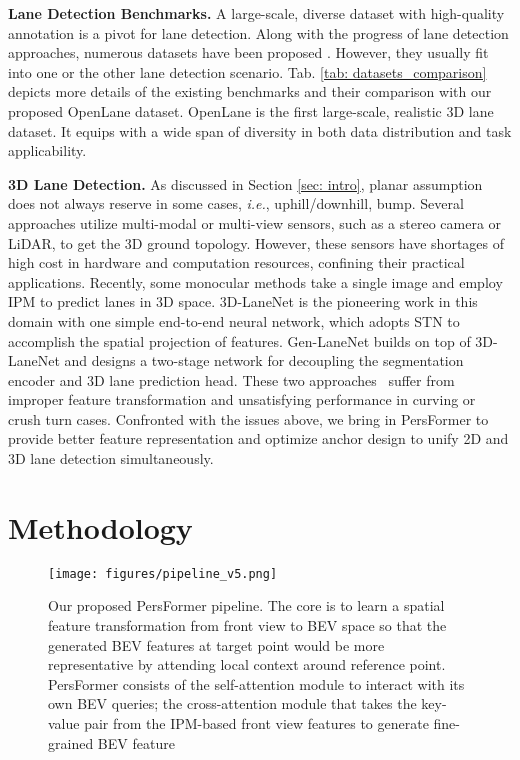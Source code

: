 \documentclass[runningheads]{llncs}
\begin{document}
\noindent\textbf{Lane Detection Benchmarks.}
A large-scale, diverse dataset with high-quality annotation is a pivot for lane detection. 
Along with the progress of lane detection approaches, numerous datasets have been proposed \cite{lee2017vpgnet,huang2019apolloscape,yu2020bdd100k,tusimple2017,llamas2019,pan2018spatial,xu2020curvelane,ChenICME22}.
However, they usually fit into one or the other lane detection scenario.
Tab. \ref{tab: datasets_comparison} depicts more details of the existing benchmarks and their comparison with our proposed OpenLane dataset. 
OpenLane is the first large-scale, realistic 3D lane dataset. It equips with a  wide span of diversity in both data distribution and task applicability.


\noindent\textbf{3D Lane Detection.} As discussed in Section \ref{sec: intro}, planar assumption does not always reserve in some cases, \textit{i.e.}, 
uphill/downhill, bump. 
Several approaches \cite{nedevschi20043d,benmansour2008stereovision,bai2018deep} utilize multi-modal or multi-view sensors, such as a stereo camera or LiDAR, to get the 3D ground topology. 
However, these sensors have shortages of high cost in hardware and computation resources, confining their practical applications. 
Recently, some monocular methods \cite{Garnett_2019_ICCV,guo2020gen,jin2021robust,liu2022learning} take a single image and employ IPM to predict lanes in 3D space.
3D-LaneNet \cite{Garnett_2019_ICCV} is the pioneering work in this domain with one simple end-to-end neural network, which adopts STN \cite{jaderberg2015spatial} to accomplish the spatial projection of features. 
Gen-LaneNet \cite{guo2020gen} builds on top of 3D-LaneNet and designs a two-stage network for decoupling the segmentation encoder and 3D lane prediction head. 
These two approaches~\cite{Garnett_2019_ICCV,guo2020gen} suffer from improper feature transformation and unsatisfying performance in curving or crush turn cases.
Confronted with the issues above, 
we bring in PersFormer to provide better feature representation 
and
optimize 
anchor design to unify 2D and 3D lane detection simultaneously.
%
 

\section{Methodology}\label{sec: algorithm}
\begin{figure}[t]
\centering
  \texttt{[image: figures/pipeline\_v5.png]}
  \caption{Our proposed PersFormer pipeline. The core is to learn a spatial feature transformation from front view to BEV space so that the generated BEV features at target point would be more representative by attending local context around reference point. 
PersFormer consists of the self-attention module to interact with its own BEV queries; the cross-attention module that takes the key-value pair from the IPM-based front view features to generate fine-grained BEV feature
  }
  \label{fig:pipeline}
\end{figure}
\end{document}
